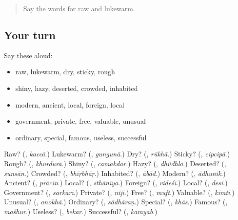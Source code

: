 \label{lesson:HI-R242-second-pass-words-from-chapters-238-242}



\begin{quote}
Say the words for raw and lukewarm.
\end{quote}

\subsection*{Your turn}
Say these aloud:

\begin{itemize}
\raggedright
  \item raw, lukewarm, dry, sticky, rough
  \item shiny, hazy, deserted, crowded, inhabited
  \item modern, ancient, local, foreign, local
  \item government, private, free, valuable, unusual
  \item ordinary, special, famous, useless, successful
\end{itemize}

\begin{tcolorbox}[breakable,colback=teal!4,colframe=teal!35!black,title={Before you move on}]
Raw? (\textbf{}, \emph{kaccā}.) Lukewarm? (\textbf{}, \emph{gungunā}.) Dry? (\textbf{}, \emph{rūkhā}.) Sticky? (\textbf{}, \emph{cipcipā}.) Rough? (\textbf{}, \emph{khurdurā}.) Shiny? (\textbf{}, \emph{camakdār}.) Hazy? (\textbf{}, \emph{dhũdhlā}.) Deserted? (\textbf{}, \emph{sunsān}.) Crowded? (\textbf{}, \emph{bhīṛbhāṛ}.) Inhabited? (\textbf{}, \emph{ābād}.) Modern? (\textbf{}, \emph{ādhunik}.) Ancient? (\textbf{}, \emph{prācīn}.) Local? (\textbf{}, \emph{sthānīya}.) Foreign? (\textbf{}, \emph{videśī}.) Local? (\textbf{}, \emph{desī}.) Government? (\textbf{}, \emph{sarkārī}.) Private? (\textbf{}, \emph{nijī}.) Free? (\textbf{}, \emph{muft}.) Valuable? (\textbf{}, \emph{kīmtī}.) Unusual? (\textbf{}, \emph{anokhā}.) Ordinary? (\textbf{}, \emph{sādhāraṇ}.) Special? (\textbf{}, \emph{khās}.) Famous? (\textbf{}, \emph{maśhūr}.) Useless? (\textbf{}, \emph{bekār}.) Successful? (\textbf{}, \emph{kāmyāb}.)
\end{tcolorbox}
